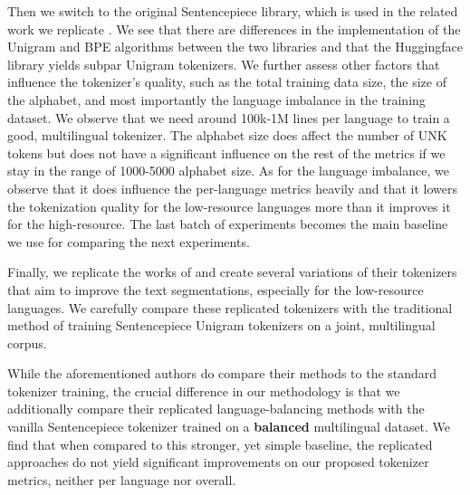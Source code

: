Then we switch to the original Sentencepiece library, which is used in the related work we replicate \cite{conneau_unsupervised_2020,chung_improving_2020,zheng_allocating_2021,liang_xlm-v_2023}. We see that there are differences in the implementation of the Unigram and BPE algorithms between the two libraries and that the Huggingface library yields subpar Unigram tokenizers. We further assess other factors that influence the tokenizer's quality, such as the total training data size, the size of the alphabet, and most importantly the language imbalance in the training dataset. We observe that we need around 100k-1M lines per language to train a good, multilingual tokenizer. The alphabet size does affect the number of UNK tokens but does not have a significant influence on the rest of the metrics if we stay in the range of 1000-5000 alphabet size. As for the language imbalance, we observe that it does influence the per-language metrics heavily and that it lowers the tokenization quality for the low-resource languages more than it improves it for the high-resource. The last batch of experiments becomes the main baseline we use for comparing the next experiments.

Finally, we replicate the works of \citet{chung_improving_2020,zheng_allocating_2021,liang_xlm-v_2023} and create several variations of their tokenizers that aim to improve the text segmentations, especially for the low-resource languages. We carefully compare these replicated tokenizers with the traditional method of training Sentencepiece Unigram tokenizers on a joint, multilingual corpus. 

While the aforementioned authors do compare their methods to the standard tokenizer training, the crucial difference in our methodology is that we additionally compare their replicated language-balancing methods with the vanilla Sentencepiece tokenizer trained on a \textbf{balanced} multilingual dataset. We find that when compared to this stronger, yet simple baseline, the replicated approaches do not yield significant improvements on our proposed tokenizer metrics, neither per language nor overall.


